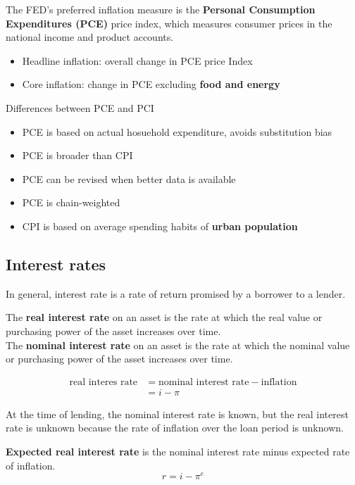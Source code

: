 \begin{remark}
    The FED's preferred inflation measure is the \textbf{Personal Consumption Expenditures (PCE)} price index, which measures consumer prices in the national income and product accounts.
    \begin{itemize}
        \item Headline inflation: overall change in PCE price Index
        \item Core inflation: change in PCE excluding \textbf{food and energy}
    \end{itemize} 

    Differences between PCE and PCI 
    \begin{itemize}
        \item PCE is based on actual hosuehold expenditure, avoids substitution bias
        \item PCE is broader than CPI
        \item PCE can be revised when better data is available
        \item PCE is chain-weighted
        \item CPI is based on average spending habits of \textbf{urban population}
    \end{itemize} 
\end{remark}

\subsection{Interest rates}

In general, interest rate is a rate of return promised by a borrower to a lender.

\begin{definition}
    The \textbf{real interest rate} on an asset is the rate at which the real value or purchasing power of the asset increases over time. \\


    The \textbf{nominal interest rate} on an asset is the rate at which the nominal value or purchasing power of the asset increases over time.

    \begin{align*}
    \text{real interes rate} &= \text{nominal interest rate} - \text{inflation} \\
    &= i - \pi
    \end{align*}
\end{definition}

At the time of lending, the nominal interest rate is known, but the real interest rate is unknown because the rate of inflation over the loan period is unknown.

\begin{definition}
    \textbf{Expected real interest rate} is the nominal interest rate minus expected rate of inflation. 
    \[
        r = i - \pi^e
    \]
\end{definition}

\pagebreak





